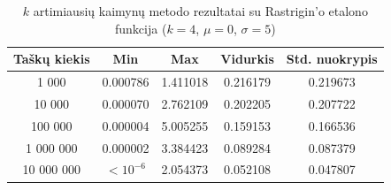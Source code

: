 \begin{table}[H]
    \centering
    \begin{tabular}{|c|c|c|c|c|}
        \hline
        \textbf{Taškų kiekis} & \textbf{Min} & \textbf{Max} & \textbf{Vidurkis} & \textbf{Std. nuokrypis} \\ \hline
        1 000        & 0.000786 & 1.411018 & 0.216179 & 0.219673 \\ \hline
        10 000       & 0.000070 & 2.762109 & 0.202205 & 0.207722 \\ \hline
        100 000      & 0.000004 & 5.005255 & 0.159153 & 0.166536 \\ \hline
        1 000 000    & 0.000002 & 3.384423 & 0.089284 & 0.087379 \\ \hline
        10 000 000   & $<10^{-6}$ & 2.054373 & 0.052108 & 0.047807 \\ \hline
    \end{tabular}
    \caption{$k$ artimiausių kaimynų metodo rezultatai su Rastrigin'o etalono funkcija ($k = 4$, $\mu = 0$, $\sigma = 5$)}
\end{table}